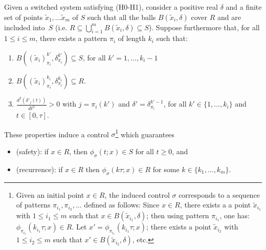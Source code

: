 \begin{corollary}
Given a switched system satisfying (H0-H1), consider
a positive real $\delta$ %
%
and a finite set of points
$\tilde{x}_1,\dots\tilde{x}_m$ of $S$ such that all the balls $B(\tilde{x}_i,\delta)$ 
cover $R$ and are included into~$S$ (i.e. $R\subseteq \bigcup_{i=1}^mB(\tilde{x}_i,\delta)\subseteq S$).
%
Suppose furthermore that, for all $1\leq i\leq m$, there exists a pattern $\pi_i$ of length $k_i$ such that:
\begin{enumerate}
\item $B((\tilde{x}_i)_{\pi_i}^{k'},\delta_{\pi_i}^{k'}) \subseteq S$,
for all $k'=1,\dots,k_i-1$
%
\item 
$B((\tilde{x}_i)_{\pi_i}^{k_i}, \delta_{\pi_i}^{k_i}) \subseteq R.$
%
\item $\frac{d^2(\delta'_j(t))}{dt^2}>0$ 
with $j=\pi_i(k')$ and $\delta'=\delta_{\pi_i}^{k'-1}$, for all 
$k'\in\{1,...,k_i\}$ and $t\in [0,\tau]$.
\end{enumerate}
These properties induce a control
$\sigma$\footnote{Given an initial point $x\in R$, the induced control $\sigma$ corresponds to a sequence
of patterns $\pi_{i_1},\pi_{i_2},\dots$ defined as follows:
Since  $x\in R$, there exists a 
a point $\tilde{x}_{i_1}$  with $1\leq i_1\leq m$ such that $x\in B(\tilde{x}_{i_1},\delta)$; then using pattern $\pi_{i_1}$, one has: $\phi_{\pi_{i_1}}(k_{i_1}\tau;x)\in R$. Let $x'=\phi_{\pi_{i_1}}(k_{i_1}\tau;x)$; there exists a point $\tilde{x}_{i_2}$ with $1\leq i_2\leq m$ such that $x'\in B(\tilde{x}_{i_2},\delta)$, etc.}
%
which guarantees
\begin{itemize}
\item (safety): if $x\in R$, then $\phi_{\sigma}(t;x) \in S$ for all $t\geq 0$,
and
\item (recurrence):
if $x\in R$ then $\phi_{\sigma}(k\tau;x)\in R$ for some $k\in\{k_1,\dots,k_m\}$.
\end{itemize}
%
\label{propter:1}
\end{corollary}



